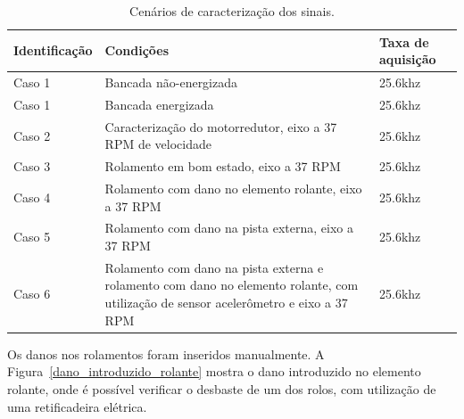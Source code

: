 \documentclass[
	12pt,				
	oneside,			
	a4paper,			
	english,			
	brazil,			
	]{abntex2ppgsi}
\begin{document}
\begin{table}[h]
\caption{Cenários de caracterização dos sinais.}
\begin{tabularx}{\textwidth}{|X|X|X|}
\hline
Identificação & Condições~                                                                                                                          & Taxa de aquisição  \\ 
\hline
Caso
1        & Bancada não-energizada                                                                                                              & 25.6khz            \\ 
\hline
Caso 1        & Bancada energizada                                                                                                                  & 25.6khz            \\ 
\hline
Caso 2        & Caracterização do motorredutor, eixo a 37 RPM de velocidade                                                                         & 25.6khz            \\ 
\hline
Caso 3        & Rolamento em bom estado, eixo a 37 RPM                                                                                              & 25.6khz            \\ 
\hline
Caso 4        & Rolamento com dano no elemento rolante, eixo a 37 RPM                                                                               & 25.6khz            \\ 
\hline
Caso 5        & Rolamento com dano na pista externa, eixo a 37 RPM                                                                                  & 25.6khz            \\ 
\hline
Caso 6        & Rolamento com dano na pista externa e rolamento com dano no elemento rolante, com utilização de sensor acelerômetro e eixo a 37 RPM & 25.6khz            \\
\hline
\end{tabularx}
\label{tab:conjuntoDeTestes}
\end{table}

Os danos nos rolamentos foram inseridos manualmente. A Figura~\ref{dano_introduzido_rolante} mostra o dano introduzido no elemento rolante, onde é possível verificar o desbaste de um dos rolos, com utilização de uma retificadeira elétrica.
\end{document}
